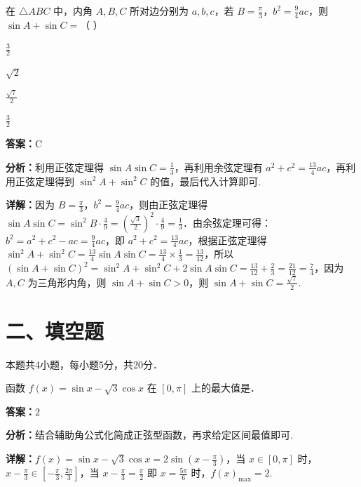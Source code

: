 \begin{question}[points=5]
在 $\triangle ABC$ 中，内角 $A, B, C$ 所对边分别为 $a, b, c$，若 $B = \frac{\pi}{3}$，$b^2 = \frac{9}{4}ac$，则 $\sin A + \sin C =$（ ）
\begin{choices}
  \item $\frac{3}{2}$
  \item $\sqrt{2}$
  \item $\frac{\sqrt{7}}{2}$
  \item $\frac{3}{2}$
\end{choices}
\begin{solution}
\textbf{答案：}C

\textbf{分析：}利用正弦定理得 $\sin A \sin C = \frac{1}{3}$，再利用余弦定理有 $a^2 + c^2 = \frac{13}{4}ac$，再利用正弦定理得到 $\sin^2 A + \sin^2 C$ 的值，最后代入计算即可.

\textbf{详解：}因为 $B = \frac{\pi}{3}$，$b^2 = \frac{9}{4}ac$，则由正弦定理得 $\sin A \sin C = \sin^2 B \cdot \frac{4}{9} = \left(\frac{\sqrt{3}}{2}\right)^2 \cdot \frac{4}{9} = \frac{1}{3}$．由余弦定理可得：$b^2 = a^2 + c^2 - ac = \frac{9}{4}ac$，即 $a^2 + c^2 = \frac{13}{4}ac$，根据正弦定理得 $\sin^2 A + \sin^2 C = \frac{13}{4} \sin A \sin C = \frac{13}{4} \times \frac{1}{3} = \frac{13}{12}$，所以 $(\sin A + \sin C)^2 = \sin^2 A + \sin^2 C + 2\sin A \sin C = \frac{13}{12} + \frac{2}{3} = \frac{21}{12} = \frac{7}{4}$，因为 $A, C$ 为三角形内角，则 $\sin A + \sin C > 0$，则 $\sin A + \sin C = \frac{\sqrt{7}}{2}$.
\end{solution}
\end{question}

\section*{二、填空题}
本题共4小题，每小题5分，共20分．

\begin{question}[points=5]
函数 $f(x) = \sin x - \sqrt{3} \cos x$ 在 $[0, \pi]$ 上的最大值是．
\fillin[{$2$}]
\begin{solution}
\textbf{答案：}$2$

\textbf{分析：}结合辅助角公式化简成正弦型函数，再求给定区间最值即可.

\textbf{详解：}$f(x) = \sin x - \sqrt{3} \cos x = 2\sin\left(x - \frac{\pi}{3}\right)$，当 $x \in [0, \pi]$ 时，$x - \frac{\pi}{3} \in [-\frac{\pi}{3}, \frac{2\pi}{3}]$，当 $x - \frac{\pi}{3} = \frac{\pi}{2}$ 即 $x = \frac{5\pi}{6}$ 时，$f(x)_{\max} = 2$.
\end{solution}
\end{question}

